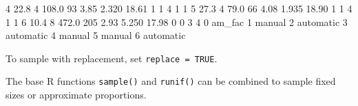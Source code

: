 \documentclass[
]{book}
\newenvironment{Shaded}{\begin{snugshade}}{\end{snugshade}}
\newcommand{\DecValTok}[1]{\textcolor[rgb]{0.00,0.00,0.81}{#1}}
\newcommand{\FloatTok}[1]{\textcolor[rgb]{0.00,0.00,0.81}{#1}}
\newcommand{\NormalTok}[1]{#1}
\begin{document}
\begin{Shaded}
\begin{Highlighting}[]
\DecValTok{4} \FloatTok{22.8}         \DecValTok{4} \FloatTok{108.0}  \DecValTok{93}       \FloatTok{3.85}  \FloatTok{2.320} \FloatTok{18.61}      \DecValTok{1}  \DecValTok{1}    \DecValTok{4}    \DecValTok{1}     \DecValTok{1}
\DecValTok{5} \FloatTok{27.3}         \DecValTok{4}  \FloatTok{79.0}  \DecValTok{66}       \FloatTok{4.08}  \FloatTok{1.935} \FloatTok{18.90}      \DecValTok{1}  \DecValTok{1}    \DecValTok{4}    \DecValTok{1}     \DecValTok{1}
\DecValTok{6} \FloatTok{10.4}         \DecValTok{8} \FloatTok{472.0} \DecValTok{205}       \FloatTok{2.93}  \FloatTok{5.250} \FloatTok{17.98}      \DecValTok{0}  \DecValTok{0}    \DecValTok{3}    \DecValTok{4}     \DecValTok{0}
\NormalTok{     am\_fac}
\DecValTok{1}\NormalTok{    manual}
\DecValTok{2}\NormalTok{ automatic}
\DecValTok{3}\NormalTok{ automatic}
\DecValTok{4}\NormalTok{    manual}
\DecValTok{5}\NormalTok{    manual}
\DecValTok{6}\NormalTok{ automatic}
\end{Highlighting}
\end{Shaded}

To sample with replacement, set \texttt{replace\ =\ TRUE}.

The base R functions \texttt{sample()} and \texttt{runif()} can be combined to sample fixed sizes or approximate proportions.
\end{document}

